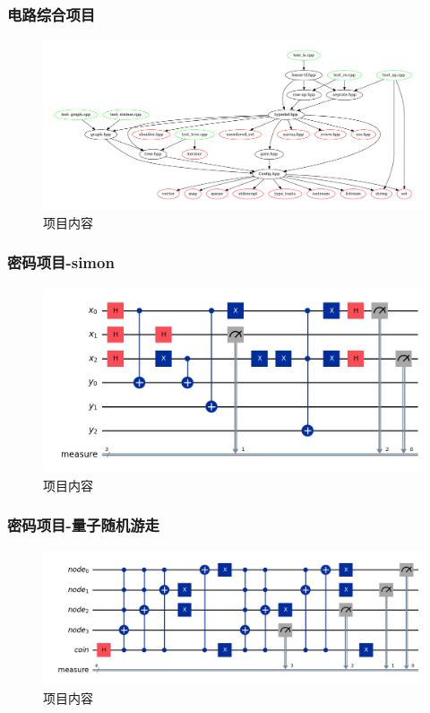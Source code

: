 \documentclass[aspectratio=1610]{beamer}
\begin{document}
\begin{frame}
    \frametitle{电路综合项目}
    \begin{figure}[htbp]
        \includegraphics[width=.8\textwidth]{dep.pdf}
        \caption{项目内容}
    \end{figure}
\end{frame}
\begin{frame}
    \frametitle{密码项目-simon}
    \begin{figure}[htbp]
        \includegraphics[width=.8\textwidth]{simon.png}
        \caption{项目内容}
    \end{figure}
\end{frame}

\begin{frame}
    \frametitle{密码项目-量子随机游走}
    \begin{figure}[htbp]
        \includegraphics[width=.8\textwidth]{qw.png}
        \caption{项目内容}
    \end{figure}
\end{frame}

\end{document}
